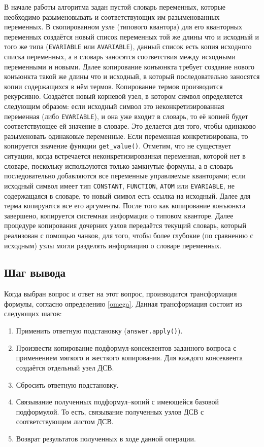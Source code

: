 В начале работы алгоритма задан пустой словарь переменных, которые необходимо разыменовывать и соответствующих им разыменованных переменных. В скопированном узле (типового квантора) для его кванторных переменных создаётся новый список переменных той же длины что и исходный и того же типа (\texttt{EVARIABLE} или \texttt{AVARIABLE}), данный список есть копия исходного списка переменных, а в словарь заносятся соответствия между исходными переменными и новыми. Далее копирование конъюнкта требует создание нового конъюнкта такой же длины что и исходный, в который последовательно заносятся копии содержащихся в нём термов. Копирование термов производится рекурсивно. Создаётся новый корневой узел, в котором символ определяется следующим образом:  если исходный символ это неконкретизированная переменная (либо \texttt{EVARIABLE}), и она уже входит в словарь, то её копией будет соответствующее ей значение в словаре. Это делается для того, чтобы одинаково разыменовать одинаковые переменные. Если переменная конкретизирована, то копируется значение функции {\tt get\_value()}. Отметим, что не существует ситуации, когда встречается неконкретизированная переменная, которой нет в словаре, поскольку используются только замкнутые формулы, а в словарь последовательно добавляются все переменные управляемые кванторами; если исходный символ имеет тип \texttt{CONSTANT}, \texttt{FUNCTION}, \texttt{ATOM} или \texttt{EVARIABLE}, не содержащаяся в словаре, то новый символ есть ссылка на исходный. Далее для терма копируются все его аргументы. После того как копирование конъюнкта завершено, копируется системная информация о типовом кванторе. Далее процедуре копирования дочерних узлов передаётся текущий словарь, который реализован с помощью чанков, для того, чтобы более глубокие (по сравнению с исходным) узлы могли разделять информацию о словаре переменных.


\subsection{Шаг вывода} Когда выбран вопрос и ответ на этот вопрос, производится трансформация формулы, согласно определению \ref{omega}.
Данная трансформация состоит из следующих шагов:
\begin{enumerate}
\item Применить ответную подстановку (\texttt{answer.apply()}).
\item Произвести копирование подформул-консеквентов заданного вопроса с применением мягкого и жесткого копирования. Для каждого консеквента создаётся отдельный узел ДСВ.
\item Сбросить ответную подстановку.
\item Связывание полученных подформул--копий с имеющейся базовой подформулой. То есть, связывание полученных узлов ДСВ с соответствующим листом ДСВ.
\item Возврат результатов полученных в ходе данной операции.
\end{enumerate}


